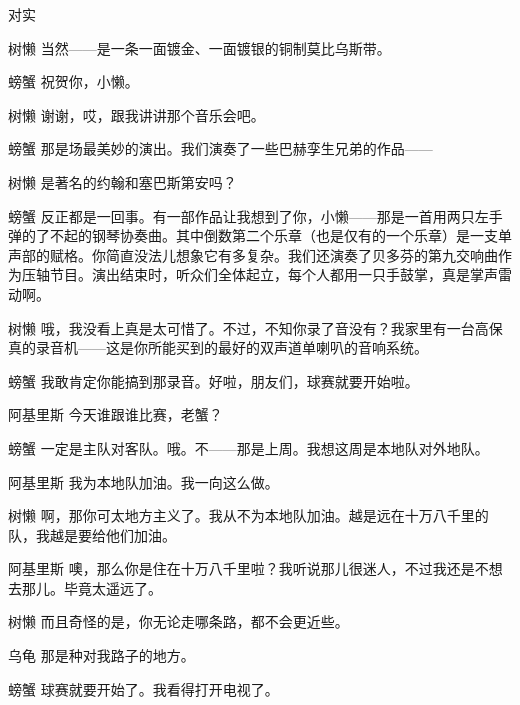 \begin{dialog}{对实}
\begin{dialogue}
\item[树懒]当然——是一条一面镀金、一面镀银的铜制莫比乌斯带。

\item[螃蟹]祝贺你，小懒。

\item[树懒]谢谢，哎，跟我讲讲那个音乐会吧。

\item[螃蟹]那是场最美妙的演出。我们演奏了一些巴赫孪生兄弟的作品——

\item[树懒]是著名的约翰和塞巴斯第安吗？

\item[螃蟹]反正都是一回事。有一部作品让我想到了你，小懒——那是一首用两只左手弹的了不起的钢琴协奏曲。其中倒数第二个乐章（也是仅有的一个乐章）是一支单声部的赋格。你简直没法儿想象它有多复杂。我们还演奏了贝多芬的第九交响曲作为压轴节目。演出结束时，听众们全体起立，每个人都用一只手鼓掌，真是掌声雷动啊。

\item[树懒]哦，我没看上真是太可惜了。不过，不知你录了音没有？我家里有一台高保真的录音机——这是你所能买到的最好的双声道单喇叭的音响系统。

\item[螃蟹]我敢肯定你能搞到那录音。好啦，朋友们，球赛就要开始啦。

\item[阿基里斯]今天谁跟谁比赛，老蟹？

\item[螃蟹]一定是主队对客队。哦。不——那是上周。我想这周是本地队对外地队。

\item[阿基里斯]我为本地队加油。我一向这么做。

\item[树懒]啊，那你可太地方主义了。我从不为本地队加油。越是远在十万八千里的队，我越是要给他们加油。

\item[阿基里斯]噢，那么你是住在十万八千里啦？我听说那儿很迷人，不过我还是不想去那儿。毕竟太遥远了。

\item[树懒]而且奇怪的是，你无论走哪条路，都不会更近些。

\item[乌龟]那是种对我路子的地方。

\item[螃蟹]球赛就要开始了。我看得打开电视了。



\end{dialogue}
\end{dialog}
